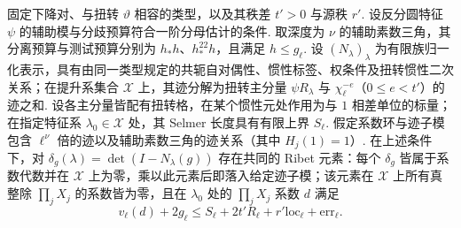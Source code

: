 \begin{lemma}
\label{lem:c-ribet-columns}
\emitthmsource
固定下降对、与扭转 $\vartheta$ 相容的类型，以及其秩差 $t'>0$ 与源秩 $r'$.
设反分圆特征 $\psi$ 的辅助模与分歧预算符合一阶分母估计的条件.
取深度为 $\nu$ 的辅助素数三角，其分离预算与测试预算分别为 $h_* h$、$h_*^{22}h$，且满足 $h\le g_\ell$.
设 $(N_\lambda)_\lambda$ 为有限族归一化表示，具有由同一类型规定的共轭自对偶性、惯性标签、权条件及扭转惯性二次关系；在提升系集合 $\mathcal X$ 上，其迹分解为扭转主分量 $\psi R_\lambda$ 与 $\chi_\ell^{-e}$（$0\le e<t'$）的迹之和.
设各主分量皆配有扭转格，在某个惯性元处作用为与 $1$ 相差单位的标量；在指定特征系 $\lambda_0\in\mathcal X$ 处，其 Selmer 长度具有有限上界 $S_\ell$.
假定系数环与迹子模包含 $\ell^\nu$ 倍的迹以及辅助素数三角的迹关系（其中 $H_j(1)=1$）.
在上述条件下，对 $\delta_g(\lambda)=\det(I-N_\lambda(g))$ 存在共同的 Ribet 元素：每个 $\delta_g$ 皆属于系数代数并在 $\mathcal X$ 上为零，乘以此元素后即落入给定迹子模；该元素在 $\mathcal X$ 上所有真整除 $\prod_j X_j$ 的系数皆为零，且在 $\lambda_0$ 处的 $\prod_j X_j$ 系数 $d$ 满足
\[
 v_\ell(d)+2g_\ell\le
 S_\ell+2t'R_\ell+r'\mathrm{loc}_\ell+\mathrm{err}_\ell .
\]
\end{lemma}
